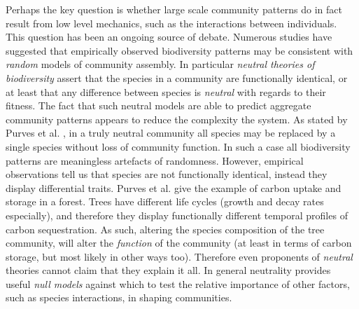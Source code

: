 Perhaps the key question is whether large scale community patterns do in fact result from low level mechanics, such as the interactions between individuals. This question has been an ongoing source of debate. Numerous studies have suggested that empirically observed biodiversity patterns may be consistent with \emph{random} models of community assembly. In particular \emph{neutral theories of biodiversity} \cite{hubbell2001unified,volkov2003neutral} assert that the species in a community are functionally identical, or at least that any difference between species is \emph{neutral} with regards to their fitness. The fact that such neutral models are able to predict aggregate community patterns appears to reduce the complexity the system. As stated by Purves et al. \cite{purves2005ecological}, in a truly neutral community all species may be replaced by a single species without loss of community function. In such a case all biodiversity patterns are meaningless artefacts of randomness. However, empirical observations tell us that species are not functionally identical, instead they display differential traits. Purves et al. give the example of carbon uptake and storage in a forest. Trees have different life cycles (growth and decay rates especially), and therefore they display functionally different temporal profiles of carbon sequestration. As such, altering the species composition of the tree community, will alter the \emph{function} of the community (at least in terms of carbon storage, but most likely in other ways too). Therefore even proponents of \emph{neutral} theories cannot claim that they explain it all. In general neutrality provides useful \emph{null models} against which to test the relative importance of other factors, such as species interactions, in shaping communities.  



